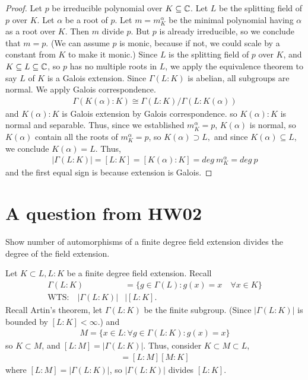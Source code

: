 \documentclass[12pt,english]{article}
\begin{document}
\begin{proof}
    Let $p$ be irreducible polynomial over $K \subseteq \mathbb{C}$.
    Let $L$ be the splitting field of $p$ over $K$.
    Let $\alpha$ be a root of $p$.
    Let $m = m_K^{\alpha}$ be the minimal polynomial having $\alpha$ as a root over $K$.
    Then $m$ divide $p$. But $p$ is already irreducible, so we conclude that $m = p$. 
    (We can assume $p$ is monic, because if not, we could scale by a constant
    from $K$ to make it monic.)
    Since $L$ is the splitting field of $p$ over $K$, and $K \subseteq L \subseteq \mathbb{C}$, 
    so $p$ has no multiple roots in $L$, we apply the equivalence theorem
    to say $L$ of $K$ is a Galois extension. Since $\Gamma(L:K)$ is abelian,
    all subgroups are normal. We apply Galois correspondence.
    \begin{align}
        \Gamma(K(\alpha):K) \cong \Gamma(L:K)/\Gamma(L:K(\alpha))
    \end{align}
    and $K(\alpha):K$ is Galois extension by Galois correspondence.
    so $K(\alpha):K$ is normal and separable.
    Thus, since we established $m_K^{\alpha} = p$, $K(\alpha)$ is normal,
    so $K(\alpha)$ contain all the roots of $m_K^{\alpha}=p$, 
    so $K(\alpha) \supset L,$ and since $K(\alpha) \subseteq L$,
    we conclude $K(\alpha) = L$. Thus,
    \begin{align}
        \lvert \Gamma(L:K) \rvert = [L:K] = [K(\alpha):K] = deg \ m_K^{\alpha} = deg \ p
    \end{align}
    and the first equal sign is because extension is Galois.
    
\end{proof}





\section*{A question from HW02}
\begin{question}
Show number of automorphisms of a finite degree field extension divides the degree of the field extension. 
\end{question}
Let $K \subset L, L:K$ be a finite degree field extension. Recall
\begin{align*}
    \Gamma(L:K) &= \{g \in \Gamma(L): g(x) = x \quad \forall x \in K\}\\
    \text{WTS:} \quad |\Gamma(L:K)| &\mid [L:K].
\end{align*} Recall Artin's theorem, let $\Gamma(L:K)$ be the finite subgroup. (Since $|\Gamma(L:K)|$ is bounded by $[L:K]<\infty$.) and 
\begin{align*}
    M = \{x \in L: \forall g \in \Gamma(L:K): g(x)= x\}
\end{align*} so $K \subset M$, and $[L:M]=|\Gamma(L:K)|$. Thus, consider $K \subset M \subset L$,
\begin{align*}
    [L:K] = [L:M][M:K]
\end{align*} where $[L:M] = |\Gamma(L:K)|$, so $|\Gamma(L:K)|$ divides $[L:K]$.
\end{document}
